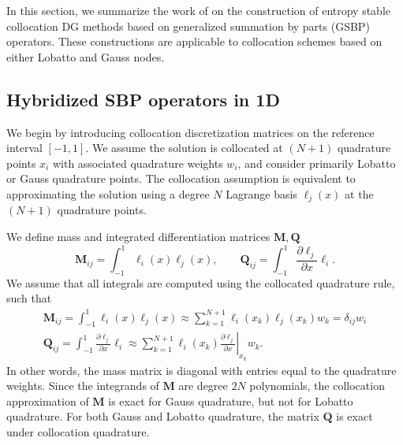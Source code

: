 \documentclass{svjour3}                     %
\newcommand{\pd}[2]{\frac{\partial#1}{\partial#2}}
\newcommand{\LRl}[1]{\left. #1 \right|}
\begin{document}
In this section, we summarize the work of \cite{chan2018efficient} on the construction of entropy stable collocation DG methods based on generalized summation by parts (GSBP) operators.  These constructions are applicable to collocation schemes based on either Lobatto and Gauss nodes.  

\subsection{Hybridized SBP operators in 1D}

We begin by introducing collocation discretization matrices on the reference interval $[-1,1]$.  We assume the solution is collocated at $(N+1)$ quadrature points $x_i$ with associated quadrature weights $w_i$, and consider primarily Lobatto or Gauss quadrature points.  The collocation assumption is equivalent to approximating the solution using a degree $N$ Lagrange basis $\ell_j(x)$ at the $(N+1)$ quadrature points.  

We define mass and integrated differentiation matrices $\bm{M}, \bm{Q}$
\[
\bm{M}_{ij} = \int_{-1}^1 \ell_i(x)\ell_j(x), \qquad \bm{Q}_{ij} = \int_{-1}^1 \pd{\ell_j}{x}\ell_i.
\]
We assume that all integrals are computed using the collocated quadrature rule, such that 
\begin{gather*}
\bm{M}_{ij} = \int_{-1}^1 \ell_i(x)\ell_j(x) \approx \sum_{k=1}^{N+1} \ell_i(x_k)\ell_j(x_k) w_k = \delta_{ij} w_i\\
\bm{Q}_{ij} = \int_{-1}^1 \pd{\ell_j}{x}\ell_i \approx \sum_{k=1}^{N+1} \ell_i(x_k)\LRl{\pd{\ell_j}{x}}_{x_k} w_k.  
\end{gather*}
In other words, the mass matrix is diagonal with entries equal to the quadrature weights.  Since the integrands of $\bm{M}$ are degree $2N$ polynomials, the collocation approximation of $\bm{M}$ is exact for Gauss quadrature, but not for Lobatto quadrature.  For both Gauss and Lobatto quadrature, the matrix $\bm{Q}$ is exact under collocation quadrature.
\end{document}
